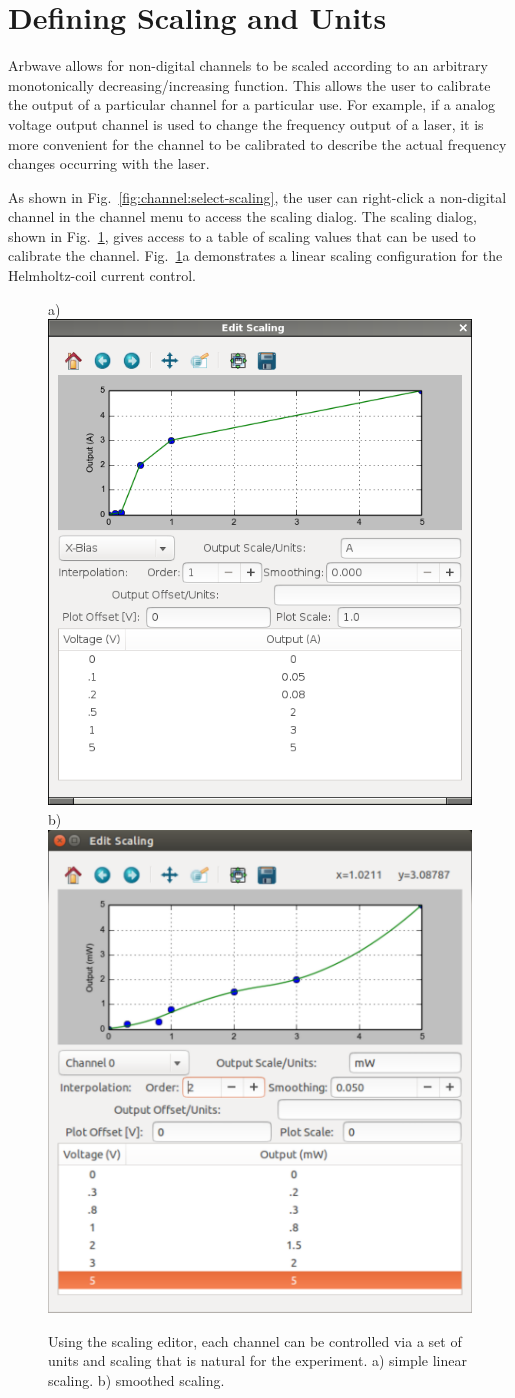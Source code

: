 \section{Defining Scaling and Units}\label{sec:channels:scaling}
Arbwave allows for non-digital channels to be scaled according to an arbitrary
monotonically decreasing/increasing function.  This allows the user to calibrate
the output of a particular channel for a particular use.  For example, if a
analog voltage output channel is used to change the frequency output of a laser,
it is more convenient for the channel to be calibrated to describe the actual
frequency changes occurring with the laser.

As shown in Fig.~\ref{fig:channel:select-scaling},
the user can right-click a non-digital channel in the channel menu to access the
scaling dialog.  The scaling dialog, shown in Fig.~\ref{fig:channel:scaling}, gives
access to a table of scaling values that can be used to calibrate the channel.
Fig.~\ref{fig:channel:scaling}a demonstrates a linear scaling configuration for
the Helmholtz-coil current control.


\begin{figure}[hb]
  \centerline{
    a) \includegraphics[width=.4\textwidth]{figures/scaling-v0}
    \hspace{.2em}
    b) \includegraphics[width=.4\textwidth]{figures/scaling}
  }
  \caption{
    Using the scaling editor, each channel can be controlled via a set of units
    and scaling that is natural for the experiment.  a) simple linear scaling.
    b) smoothed scaling.
  }
  \label{fig:channel:scaling}
\end{figure}

